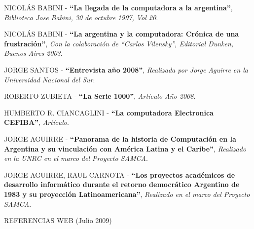 \documentclass[%
  	final,
%
	notitlepage,
	narroweqnarray,
	inline,
 	twoside,
	]{ieee}
\newcommand{\link}[1]{\textit{#1}}
\newcommand{\ibiblio}[3]{
	\uppercase{#1} - \textbf{``#2''}, \link{#3}.
}
\begin{document}
\begin{thebibliography}{1}

 \ibiblio{Nicol\'as Babini}{La llegada de la computadora a la argentina}{Biblioteca Jose Babini, 30 de octubre 1997, Vol 20}
 \ibiblio{Nicol\'as Babini}{La argentina y la computadora: Cr\'onica de una frustraci\'on}
{Con la colaboraci\'on de ``Carlos Vilensky'', Editorial Dunken, Buenos Aires 2003}
 \ibiblio{Jorge Santos}{Entrevista a\~no 2008}{Realizada por Jorge Aguirre en la Universidad Nacional del Sur}
 \ibiblio{Roberto Zubieta}{La Serie 1000}{Art\'iculo A\~no 2008}
 \ibiblio{Humberto R. Ciancaglini}{La computadora Electronica CEFIBA}{Art\'iculo}
 \ibiblio{Jorge Aguirre}{Panorama de la historia de Computaci\'on en la Argentina y su vinculaci\'on con Am\'erica Latina y el Caribe}{Realizado en la UNRC en el marco del Proyecto SAMCA}
 \ibiblio{Jorge Aguirre, Raul Carnota}{Los proyectos acad\'emicos de desarrollo inform\'atico durante el retorno democr\'atico Argentino de 1983 y su proyecci\'on Latinoamericana}{Realizado en el marco del Proyecto SAMCA}\\


\begin{center}REFERENCIAS WEB (Julio 2009)\end{center}


\end{thebibliography}
\end{document}
